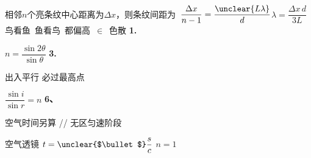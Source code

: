 相邻$n$个亮条纹中心距离为$\Delta x$，则条纹间距为\ $\dfrac{\Delta x}{n-1}=\dfrac{\unclear{L\lambda}}{d}$\qquad $\lambda=\dfrac{\Delta x\,d}{3L}$
鸟看鱼\ 鱼看鸟\ 都偏高\qquad {}\ $\in$\ 色散
\textbf{1.}

 $n=\dfrac{\sin 2\theta}{\sin\theta}$ %
\textbf{3.}


出入平行 必过最高点

$\dfrac{\sin i}{\sin r}=n$
\textbf{6、}
\begin{keybox}
空气时间另算 // 无区匀速阶段
\end{keybox}
空气透镜 \quad $t=\text{\unclear{$\bullet$}}\dfrac{s}{c}$ \quad $n=1$ %
